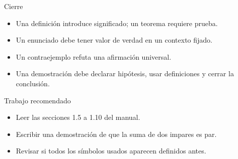\documentclass[aspectratio=169,11pt]{beamer}
\begin{document}
\begin{frame}{Cierre}
\begin{itemize}
  \item Una definición introduce significado; un teorema requiere prueba.
  \item Un enunciado debe tener valor de verdad en un contexto fijado.
  \item Un contraejemplo refuta una afirmación universal.
  \item Una demostración debe declarar hipótesis, usar definiciones y cerrar la conclusión.
\end{itemize}
\end{frame}

\begin{frame}{Trabajo recomendado}
\begin{itemize}
  \item Leer las secciones 1.5 a 1.10 del manual.
  \item Escribir una demostración de que la suma de dos impares es par.
  \item Revisar si todos los símbolos usados aparecen definidos antes.
\end{itemize}
\end{frame}
\end{document}
